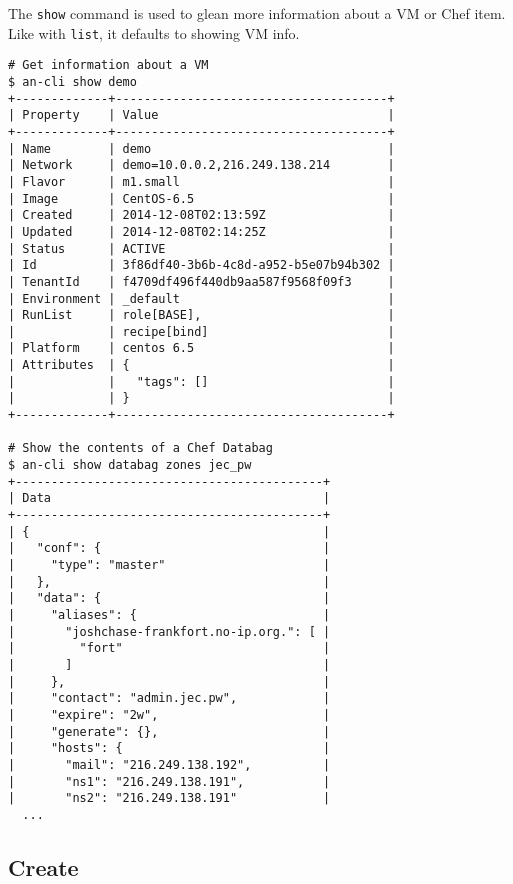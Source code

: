 \documentclass[11pt]{article}
\begin{document}
The \texttt{show} command is used to glean more information about a VM
or Chef item. Like with \texttt{list}, it defaults to showing VM info.
\pagebreak
\begin{lstlisting}
# Get information about a VM
$ an-cli show demo
+-------------+--------------------------------------+
| Property    | Value                                |
+-------------+--------------------------------------+
| Name        | demo                                 |
| Network     | demo=10.0.0.2,216.249.138.214        |
| Flavor      | m1.small                             |
| Image       | CentOS-6.5                           |
| Created     | 2014-12-08T02:13:59Z                 |
| Updated     | 2014-12-08T02:14:25Z                 |
| Status      | ACTIVE                               |
| Id          | 3f86df40-3b6b-4c8d-a952-b5e07b94b302 |
| TenantId    | f4709df496f440db9aa587f9568f09f3     |
| Environment | _default                             |
| RunList     | role[BASE],                          |
|             | recipe[bind]                         |
| Platform    | centos 6.5                           |
| Attributes  | {                                    |
|             |   "tags": []                         |
|             | }                                    |
+-------------+--------------------------------------+

# Show the contents of a Chef Databag
$ an-cli show databag zones jec_pw
+-------------------------------------------+
| Data                                      |
+-------------------------------------------+
| {                                         |
|   "conf": {                               |
|     "type": "master"                      |
|   },                                      |
|   "data": {                               |
|     "aliases": {                          |
|       "joshchase-frankfort.no-ip.org.": [ |
|         "fort"                            |
|       ]                                   |
|     },                                    |
|     "contact": "admin.jec.pw",            |
|     "expire": "2w",                       |
|     "generate": {},                       |
|     "hosts": {                            |
|       "mail": "216.249.138.192",          |
|       "ns1": "216.249.138.191",           |
|       "ns2": "216.249.138.191"            |
  ...
\end{lstlisting}

\subsection{Create}
\end{document}
